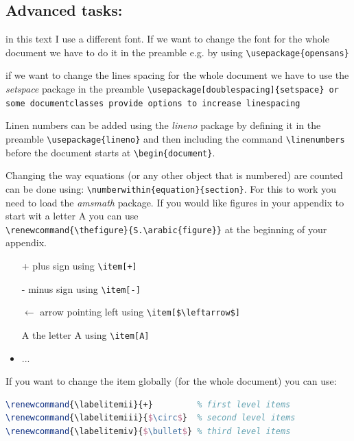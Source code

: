 \documentclass{article}
\numberwithin{equation}{section}
\begin{document}
\subsection{Advanced tasks:}

{\selectfont
	in this text I use a different font. If we want to change the font for the whole document we have to do it in the preamble e.g. by using \texttt{\textbackslash usepackage\{opensans\}}
}


if we want to change the lines spacing for the whole document we have to use the \textit{setspace} package in the preamble \texttt{\textbackslash usepackage[doublespacing]\{setspace\} or some documentclasses provide options to increase linespacing}

Linen numbers can be added using the \textit{lineno} package by defining it in the preamble \texttt{\textbackslash usepackage\{lineno\}} and then including the command \texttt{\textbackslash linenumbers} before the document starts at \texttt{\textbackslash begin\{document\}}.

Changing the way equations (or any other object that is numbered) are counted can be done using: \texttt{\textbackslash numberwithin\{equation\}\{section\}}. For this to work you need to load the \textit{amsmath} package. If you would like figures in your appendix to start wit a letter A you can use \\ \texttt{\textbackslash renewcommand\{\textbackslash thefigure\}\{S.\textbackslash arabic\{figure\}\}} at the beginning of your appendix.

\begin{itemize}
	\item[+] plus sign using \texttt{\textbackslash item[+]}
	\item[-] minus sign using \texttt{\textbackslash item[-]}
	\item[$\leftarrow$] arrow pointing left using \texttt{\textbackslash item[\$\textbackslash leftarrow\$]}
	\item[A] the letter A using \texttt{\textbackslash item[A]}
	\item ...
\end{itemize}

If you want to change the item globally (for the whole document) you can use:
\begin{lstlisting}[language=tex]
\renewcommand{\labelitemii}{+}         % first level items
\renewcommand{\labelitemiii}{$\circ$}  % second level items
\renewcommand{\labelitemiv}{$\bullet$} % third level items
\end{lstlisting}
\end{document}
